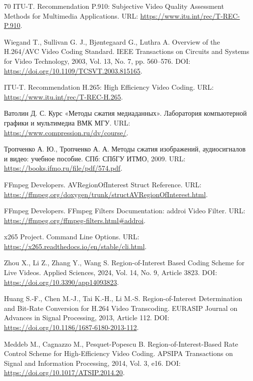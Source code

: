 \documentclass[12pt,a4paper,oneside,openany]{report}
\begin{document}
\begin{thebibliography}{70}
ITU-T.
Recommendation P.910: Subjective Video Quality Assessment Methods for Multimedia Applications.
URL: \url{https://www.itu.int/rec/T-REC-P.910}.


Wiegand T., Sullivan G. J., Bjøntegaard G., Luthra A.
Overview of the H.264/AVC Video Coding Standard.
IEEE Transactions on Circuits and Systems for Video Technology, 2003, Vol. 13, No. 7, pp. 560--576.
DOI: \url{https://doi.org/10.1109/TCSVT.2003.815165}.

ITU-T.
Recommendation H.265: High Efficiency Video Coding.
URL: \url{https://www.itu.int/rec/T-REC-H.265}.

Ватолин Д. С.
Курс «Методы сжатия медиаданных».
Лаборатория компьютерной графики и мультимедиа ВМК МГУ.
URL: \url{https://www.compression.ru/dv/course/}.

Тропченко А. Ю., Тропченко А. А.
Методы сжатия изображений, аудиосигналов и видео: учебное пособие.
СПб: СПбГУ ИТМО, 2009.
URL: \url{https://books.ifmo.ru/file/pdf/574.pdf}.

FFmpeg Developers.
AVRegionOfInterest Struct Reference.
URL: \url{https://ffmpeg.org/doxygen/trunk/structAVRegionOfInterest.html}.

FFmpeg Developers.
FFmpeg Filters Documentation: addroi Video Filter.
URL: \url{https://ffmpeg.org/ffmpeg-filters.html#addroi}.

x265 Project.
Command Line Options.
URL: \url{https://x265.readthedocs.io/en/stable/cli.html}.

Zhou X., Li Z., Zhang Y., Wang S.
Region-of-Interest Based Coding Scheme for Live Videos.
Applied Sciences, 2024, Vol. 14, No. 9, Article 3823.
DOI: \url{https://doi.org/10.3390/app14093823}.

Huang S.-F., Chen M.-J., Tai K.-H., Li M.-S.
Region-of-Interest Determination and Bit-Rate Conversion for H.264 Video Transcoding.
EURASIP Journal on Advances in Signal Processing, 2013, Article 112.
DOI: \url{https://doi.org/10.1186/1687-6180-2013-112}.

Meddeb M., Cagnazzo M., Pesquet-Popescu B.
Region-of-Interest-Based Rate Control Scheme for High-Efficiency Video Coding.
APSIPA Transactions on Signal and Information Processing, 2014, Vol. 3, e16.
DOI: \url{https://doi.org/10.1017/ATSIP.2014.20}.


\end{thebibliography}
\end{document}
